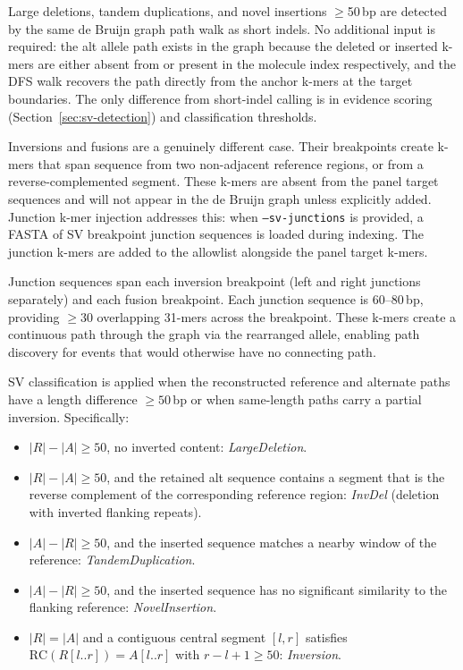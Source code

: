Large deletions, tandem duplications, and novel insertions $\ge$50\,bp are detected by the same de Bruijn graph path walk as short indels. No additional input is required: the alt allele path exists in the graph because the deleted or inserted k-mers are either absent from or present in the molecule index respectively, and the DFS walk recovers the path directly from the anchor k-mers at the target boundaries. The only difference from short-indel calling is in evidence scoring (Section~\ref{sec:sv-detection}) and classification thresholds.

Inversions and fusions are a genuinely different case. Their breakpoints create k-mers that span sequence from two non-adjacent reference regions, or from a reverse-complemented segment. These k-mers are absent from the panel target sequences and will not appear in the de Bruijn graph unless explicitly added. Junction k-mer injection addresses this: when \texttt{--sv-junctions} is provided, a FASTA of SV breakpoint junction sequences is loaded during indexing. The junction k-mers are added to the allowlist alongside the panel target k-mers.

Junction sequences span each inversion breakpoint (left and right junctions separately) and each fusion breakpoint. Each junction sequence is 60--80\,bp, providing $\ge 30$ overlapping 31-mers across the breakpoint. These k-mers create a continuous path through the graph via the rearranged allele, enabling path discovery for events that would otherwise have no connecting path.

SV classification is applied when the reconstructed reference and alternate paths have a length difference $\ge 50$\,bp or when same-length paths carry a partial inversion. Specifically:

\begin{itemize}
  \item $|R| - |A| \ge 50$, no inverted content: \textit{LargeDeletion}.
  \item $|R| - |A| \ge 50$, and the retained alt sequence contains a segment that is the reverse complement of the corresponding reference region: \textit{InvDel} (deletion with inverted flanking repeats).
  \item $|A| - |R| \ge 50$, and the inserted sequence matches a nearby window of the reference: \textit{TandemDuplication}.
  \item $|A| - |R| \ge 50$, and the inserted sequence has no significant similarity to the flanking reference: \textit{NovelInsertion}.
  \item $|R| = |A|$ and a contiguous central segment $[l, r]$ satisfies $\text{RC}(R[l..r]) = A[l..r]$ with $r - l + 1 \ge 50$: \textit{Inversion}.
\end{itemize}

